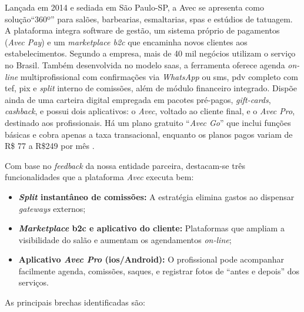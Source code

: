 Lançada em 2014 e sediada em São Paulo-SP, a Avec se apresenta como solução``360º'' para salões, barbearias, esmaltarias, spas e estúdios de tatuagem. A plataforma integra software de gestão, um sistema próprio de pagamentos (\emph{Avec Pay}) e um \emph{marketplace \gls{b2c}} que encaminha novos clientes aos estabelecimentos. Segundo a empresa, mais de 40 mil negócios utilizam o serviço no
Brasil. Também desenvolvida no modelo \gls{saas}, a ferramenta oferece agenda \emph{on-line} multiprofissional com confirmações via \emph{WhatsApp} ou \gls{sms}, \gls{pdv} completo com \gls{tef}, \gls{pix} e \emph{split} interno de comissões, além de módulo financeiro integrado. Dispõe ainda de uma carteira digital empregada em pacotes pré-pagos, \emph{gift-cards}, \emph{cashback}, e possui dois aplicativos: o \emph{Avec}, voltado ao cliente final, e o \emph{Avec Pro}, destinado aos profissionais. Há um plano gratuito ``\emph{Avec Go}'' que inclui funções básicas e cobra apenas a taxa transacional, enquanto os planos pagos variam de R\$ 77 a
R\$249 por mês \cite{Avec}.


Com base no \emph{feedback} da nossa entidade parceira, destacam-se três funcionalidades que a plataforma \emph{Avec} executa bem:

\begin{itemize}
	\item \textbf{\emph{Split} instantâneo de comissões:} A estratégia elimina gastos ao dispensar \emph{gateways} externos;
	
	\item \textbf{\emph{Marketplace} \gls{b2c} e aplicativo do cliente:} Plataformas que ampliam a visibilidade do salão e aumentam os agendamentos \emph{on-line};
	
	\item \textbf{Aplicativo \emph{Avec Pro} (\gls{ios}/Android):} O profissional pode acompanhar facilmente agenda, comissões, saques, e registrar fotos de “antes e depois” dos serviços.
\end{itemize}

As principais brechas identificadas são:

